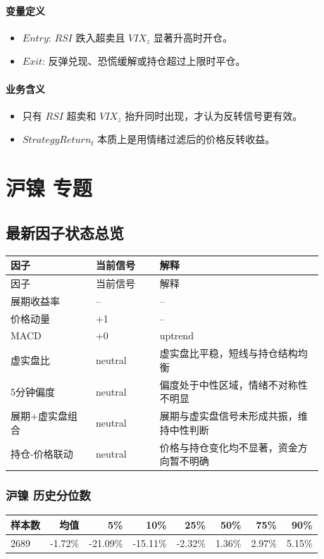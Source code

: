 \documentclass[11pt,a4paper]{ctexart}
\begin{document}
\paragraph{变量定义}
\begin{itemize}
\item $Entry$: $RSI$ 跌入超卖且 $VIX_z$ 显著升高时开仓。
\item $Exit$: 反弹兑现、恐慌缓解或持仓超过上限时平仓。
\end{itemize}
\paragraph{业务含义}
\begin{itemize}
\item 只有 $RSI$ 超卖和 $VIX_z$ 抬升同时出现，才认为反转信号更有效。
\item $StrategyReturn_t$ 本质上是用情绪过滤后的价格反转收益。
\end{itemize}
        \section{沪镍 专题}

\subsection{最新因子状态总览}
\begin{longtable}{p{0.24\linewidth}p{0.18\linewidth}p{0.46\linewidth}}
\toprule
因子 & 当前信号 & 解释 \\
\midrule
\endfirsthead
\toprule
因子 & 当前信号 & 解释 \\
\midrule
\endhead
展期收益率 & -- & -- \\
价格动量 & +1 & -- \\
MACD & +0 & uptrend \\
虚实盘比 & neutral & 虚实盘比平稳，短线与持仓结构均衡 \\
5分钟偏度 & neutral & 偏度处于中性区域，情绪不对称性不明显 \\
展期+虚实盘组合 & neutral & 展期与虚实盘信号未形成共振，维持中性判断 \\
持仓-价格联动 & neutral & 价格与持仓变化均不显著，资金方向暂不明确 \\
\bottomrule
\end{longtable}

\subsubsection{沪镍 历史分位数}
\begin{center}
\begin{tabular}{lrrrrrrr}
\toprule
样本数 & 均值 & 5\% & 10\% & 25\% & 50\% & 75\% & 90\% \\
\midrule
2689 & -1.72\% & -21.09\% & -15.11\% & -2.32\% & 1.36\% & 2.97\% & 5.15\% \\
\bottomrule
\end{tabular}
\end{center}
\end{document}
